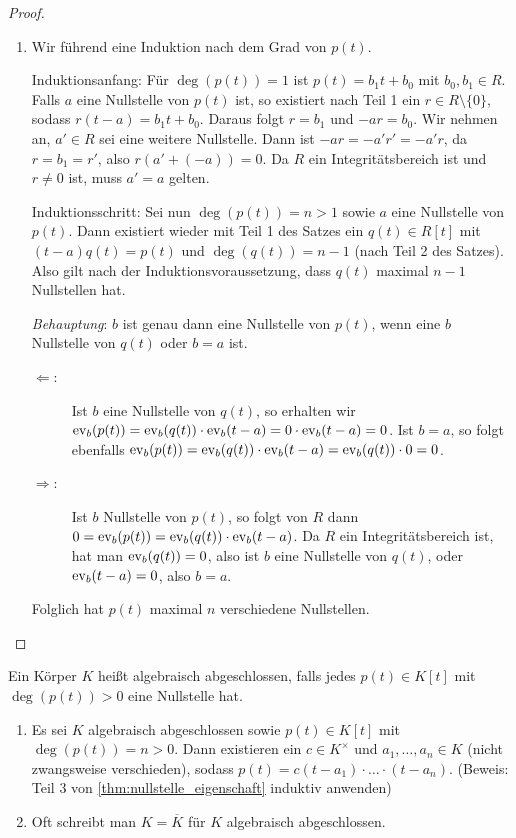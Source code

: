 \documentclass[12pt,a4paper]{scrartcl}
\begin{document}
\begin{proof}
\begin{enumerate}
		\item Wir führend eine Induktion nach dem Grad von $p(t)$.
		
		
			Induktionsanfang: Für $\deg(p(t)) = 1$ ist $p(t) = b_1t+b_0$ mit $b_0,b_1\in R$. Falls $a$ eine Nullstelle von $p(t)$ ist, so existiert nach Teil 1 ein $r\in R\setminus\{0\}$, sodass $r(t-a) = b_1t+b_0$. Daraus folgt $r = b_1$ und $-ar = b_0$. Wir nehmen an, $a' \in R$ sei eine weitere Nullstelle. Dann ist $-ar = -a'r' = -a'r$, da $r = b_1 = r'$, also $r(a'+(-a)) = 0$. Da $R$ ein Integritätsbereich ist und $r\neq 0$ ist, muss $a' = a$ gelten.
			
			
			Induktionsschritt: Sei nun $\deg(p(t)) = n>1$ sowie $a$ eine Nullstelle von $p(t)$. Dann existiert wieder mit Teil 1 des Satzes ein $q(t)\in R[t]$ mit $(t-a) q(t) = p(t)$ und $\deg(q(t)) = n-1$ (nach Teil 2 des Satzes).
			Also gilt nach der Induktionsvoraussetzung, dass $q(t)$ 
			maximal $n-1$ Nullstellen hat.
			
			\emph{Behauptung}: $b$ ist genau dann eine Nullstelle von $p(t)$, wenn eine $b$ Nullstelle von $q(t)$ oder $b = a$ ist.
			
			\begin{description}
				\item[\glqq$\Leftarrow$\grqq:] Ist $b$ eine Nullstelle von $q(t)$, so erhalten wir $\operatorname{ev}_{b}(p(t)) = \operatorname{ev}_{b}(q(t))\cdot \operatorname{ev}_b(t-a) = 0\cdot \operatorname{ev}_{b}(t-a) = 0$. Ist $b=a$, so folgt ebenfalls $\operatorname{ev}_{b}(p(t)) = \operatorname{ev}_{b}(q(t))\cdot \operatorname{ev}_b(t-a) = \operatorname{ev}_{b}(q(t))\cdot 0 = 0$.
				\item[\glqq$\Rightarrow$\grqq:] Ist $b$ Nullstelle von $p(t)$, so folgt von $R$ dann $0 = \operatorname{ev}_{b}(p(t)) = \operatorname{ev}_{b}(q(t))\cdot \operatorname{ev}_{b}(t-a)$. Da $R$ ein Integritätsbereich ist, hat man $\operatorname{ev}_{b}(q(t)) = 0$, also ist $b$ eine Nullstelle von $q(t)$, oder $\operatorname{ev}_b(t-a) = 0$, also $b=a$.
			\end{description}
			
			Folglich hat $p(t)$ maximal $n$ verschiedene Nullstellen.
	\end{enumerate}
\end{proof}


\begin{defi}
	Ein Körper $K$ heißt algebraisch abgeschlossen, falls jedes $p(t)\in K[t]$ mit $\deg(p(t))>0$ eine Nullstelle hat.
\end{defi}
\begin{bem}
	\leavevmode
	\begin{enumerate}
		\item Es sei $K$ algebraisch abgeschlossen sowie $p(t)\in K[t]$ mit $\deg(p(t)) =n > 0$. Dann existieren ein $c\in K^{\times}$ und $ a_1,\dots,a_n\in K$ (nicht zwangsweise verschieden), sodass $p(t) = c(t-a_1)\cdot \dots \cdot (t-a_n)$. (Beweis: Teil 3 von \cref{thm:nullstelle_eigenschaft} induktiv anwenden)
		\item Oft schreibt man $K = \overline{K}$ für $K$ algebraisch abgeschlossen.
	\end{enumerate}
\end{bem}
\end{document}
